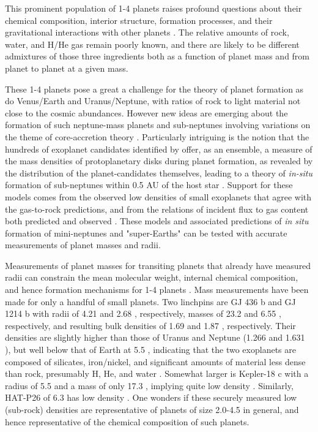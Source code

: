\documentclass{emulateapj}
\begin{document}
This prominent population of 1-4 \rearth planets raises profound
questions about their chemical composition, interior structure,
formation processes, and their gravitational interactions with other
planets \citep{Seager2007, Fortney07, Zeng_Seager08, Rogers2011,
  Zeng_Sasselov2013, Lissauer2012, Fabrycky2012}.  The relative
amounts of rock, water, and H/He gas remain poorly known, and there
are likely to be different admixtures of those three ingredients both
as a function of planet mass and from planet to planet at a given
mass.

These 1-4 \rearth planets pose a great a challenge for the theory of
planet formation as do Venus/Earth and Uranus/Neptune, with ratios of
rock to light material not close to the cosmic abundances.  However
new ideas are emerging about the formation of such neptune-mass
planets and sub-neptunes involving variations on the theme of
core-accretion theory \citep{Chiang_Laughlin2013, Mordasini2012a}.
Particularly intriguing is the notion that the hundreds of exoplanet
candidates identified by \ek offer, as an ensemble, a measure of the
mass densities of protoplanetary disks during planet formation, as
revealed by the distribution of the planet-candidates themselves, 
leading to a theory of {\it in-situ}
formation of sub-neptunes within 0.5 AU of the host star
\citep{Chiang_Laughlin2013}.  Support for these models comes from the
observed low densities of small exoplanets that agree with the
gas-to-rock predictions, and from the relations of incident flux to
gas content both predicted and observed \citep{Lopez2012, Weiss2013}.
These models and associated predictions of {\it in situ} formation of
mini-neptunes and "super-Earths" can be tested with accurate
measurements of planet masses and radii.

Measurements of planet masses for transiting planets that already have
measured radii can constrain the mean molecular weight, internal
chemical composition, and hence formation mechanisms for 1-4 \rearth
planets \citep{Seager2007, Zeng_Seager08, Zeng_Sasselov2013,
  Rogers2011, Chiang_Laughlin2013}.  Mass measurements have been made
for only a handful of small planets.  Two linchpins are GJ 436 b and
GJ 1214 b \citep{Maness07, Gillon2007, Torres2008, Charbonneau2009}
with radii of 4.21 and 2.68 \rearthe, respectively, masses of 23.2 and
6.55 \mearthe, respectively, and resulting bulk densities of 1.69 and
1.87 \gcc, respectively.  Their densities are slightly higher than
those of Uranus and Neptune (1.266 and 1.631 \gcc), but well below
that of Earth at 5.5 \gcc, indicating that the two exoplanets are
composed of silicates, iron/nickel, and significant amounts of
material less dense than rock, presumably H, He, and water
\citep{Figueira2009, Rogers_Seager2010a}.  Somewhat larger is
Kepler-18 c with a radius of 5.5 \rearth and a mass of only 17.3
\mearthe, implying quite low density \citep{Cochran2011}. Similarly,
HAT-P26 of 6.3 \rearth has low density \citep{Hartman2011}.  One
wonders if these securely measured low (sub-rock) densities are
representative of planets of size 2.0-4.5 \rearth in general, and
hence representative of the chemical composition of such planets.
\end{document}
